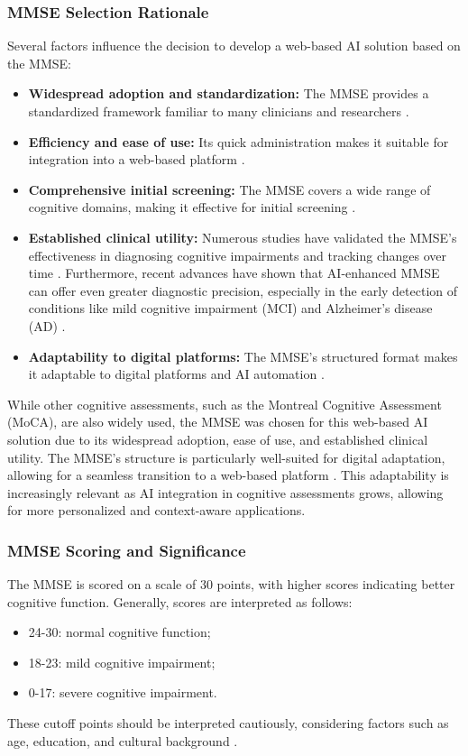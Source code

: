 \subsubsection{MMSE Selection Rationale}
Several factors influence the decision to develop a web-based AI solution based on the MMSE:
\begin{itemize}
\item \textbf{Widespread adoption and standardization:} The MMSE provides a standardized framework familiar to many clinicians and researchers \cite{Folstein1975, Crum1993}.
\item \textbf{Efficiency and ease of use:} Its quick administration makes it suitable for integration into a web-based platform \cite{Tombaugh1992}.
\item \textbf{Comprehensive initial screening:} The MMSE covers a wide range of cognitive domains, making it effective for initial screening \cite{Tombaugh1992}.
\item \textbf{Established clinical utility:} Numerous studies have validated the MMSE's effectiveness in diagnosing cognitive impairments and tracking changes over time \cite{Salmon1990, Mitchell2009}. Furthermore, recent advances have shown that AI-enhanced MMSE can offer even greater diagnostic precision, especially in the early detection of conditions like mild cognitive impairment (MCI) and Alzheimer’s disease (AD) \cite{Formica2023}.
\item \textbf{Adaptability to digital platforms:} The MMSE's structured format makes it adaptable to digital platforms and AI automation \cite{Zygouris2017}.
\end{itemize}

While other cognitive assessments, such as the Montreal Cognitive Assessment (MoCA), are also widely used, the MMSE was chosen for this web-based AI solution due to its widespread adoption, ease of use, and established clinical utility. The MMSE’s structure is particularly well-suited for digital adaptation, allowing for a seamless transition to a web-based platform \cite{Peng2020}. This adaptability is increasingly relevant as AI integration in cognitive assessments grows, allowing for more personalized and context-aware applications.

\subsubsection{MMSE Scoring and Significance}
The MMSE is scored on a scale of 30 points, with higher scores indicating better cognitive function. Generally, scores are interpreted as follows:
\begin{itemize}
\item 24-30: normal cognitive function;
\item 18-23: mild cognitive impairment;
\item 0-17: severe cognitive impairment.
\end{itemize}
These cutoff points should be interpreted cautiously, considering factors such as age, education, and cultural background \cite{Kukull1994}.

